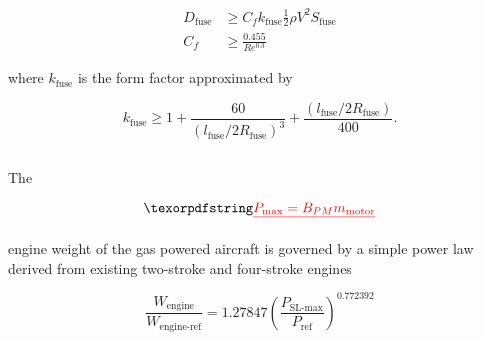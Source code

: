 \begin{align}
    \label{e:fusedrag}
    D_{\text{fuse}} &\geq C_f k_{\text{fuse}} \frac{1}{2} \rho V^2 S_{\text{fuse}} \\
    C_f &\geq \frac{0.455}{Re^{0.3}}
\end{align}

where $k_{\text{fuse}}$ is the form factor approximated by\cite{raymer}

\begin{equation}
    \label{e:fuseform}
    k_{\text{fuse}} \geq 1 + \frac{60}{(l_{\text{fuse}}/2R_{\text{fuse}})^3} + \frac{(l_{\text{fuse}}/2R_{\text{fuse}})}{400}.
\end{equation}

\DIFdelbegin \subsection{}
\addtocounter{subsection}{-1}%
\DIFdelend \DIFaddbegin \subsubsection{}
\DIFaddend 

The \DIFdelbegin {}%

\begin{displaymath}
    \DIFdel{\label{e:electricengine}
    P_{\text{max}} = B_{PM} m_{\text{motor}}
}\end{displaymath}


\DIFdelend engine weight of the gas powered aircraft is governed by a simple power law derived from existing two-stroke and four-stroke engines\cite{gasengine}

\begin{equation}
    \label{e:powerlaw}
    \frac{W_{\text{engine}}}{W_{\text{engine-ref}}} = 1.27847 \left(\frac{P_{\text{SL-max}}}{P_{\text{ref}}} \right)^{0.772392}
\end{equation}

